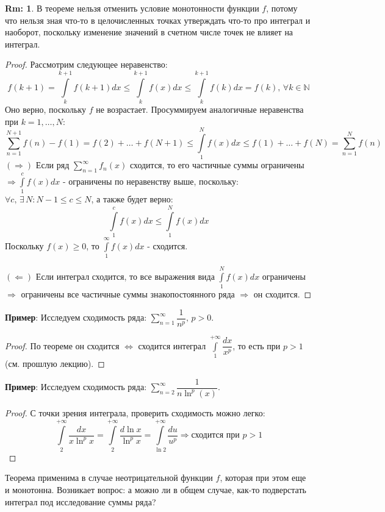 \documentclass[12pt]{article}
\newcommand{\MN}{\mathbb{N}}
\theoremstyle{definition}
\newtheorem{rem}{Rm:}
\newcommand{\ddsum}[2]{\displaystyle\sum\limits_{#1}^{#2}}
\newcommand{\ddint}[2]{\displaystyle\int\limits_{#1}^{#2}}
\newcommand{\ssum}[1]{\displaystyle \sum\limits_{n=1}^{\infty}{#1}_n}
\begin{document}
\begin{rem}
	В теореме нельзя отменить условие монотонности функции $f$, потому что нельзя зная что-то в целочисленных точках утверждать что-то про интеграл и наоборот, поскольку изменение значений в счетном числе точек не влияет на интеграл.
\end{rem}
\begin{proof}
	Рассмотрим следующее неравенство:
	$$
		f(k + 1) = \ddint{k}{k+1}f(k+1)dx \leq \ddint{k}{k+1}f(x)dx \leq  \ddint{k}{k+1}f(k)dx = f(k), \, \forall k \in \MN
	$$
	Оно верно, поскольку $f$ не возрастает. Просуммируем аналогичные неравенства при $k = 1, \dotsc, N$:
	$$
		\sum\limits_{n = 1}^{N+1}f(n) - f(1) = f(2) + \dotsc + f(N+1) \leq \ddint{1}{N}f(x)dx \leq f(1) + \dotsc + f(N) = \sum\limits_{n = 1}^{N}f(n)
	$$
	$(\Rightarrow)$ Если ряд $\ssum f(x)$ сходится, то его частичные суммы ограничены $\Rightarrow \ddint{1}{c}f(x)dx$ - ограничены по неравенству выше, поскольку: $\forall c, \, \exists  \, N \colon N-1 \leq c \leq N$, а также будет верно: 
	$$
		\ddint{1}{c}f(x)dx \leq \ddint{1}{N}f(x)dx
	$$
	Поскольку $f(x) \geq 0$, то $\ddint{1}{\infty}f(x)dx$ - сходится. 
	
	$(\Leftarrow)$ Если интеграл сходится, то все выражения вида $\ddint{1}{N}f(x)dx$ ограничены $\Rightarrow$ ограничены все частичные суммы знакопостоянного ряда $\Rightarrow$ он сходится.
\end{proof}

\textbf{Пример}: Исследуем сходимость ряда: $\ddsum{n = 1}{\infty}\dfrac{1}{n^p}, \, p > 0$. 
\begin{proof}
	По теореме он сходится $\Leftrightarrow$ сходится интеграл $\ddint{1}{+\infty}\dfrac{dx}{x^p}$, то есть при $p > 1$ (см. прошлую лекцию).
\end{proof}

\textbf{Пример}: Исследуем сходимость ряда: $\ddsum{n = 2}{\infty}\dfrac{1}{n \ln^p(x)}$. 
\begin{proof}
	С точки зрения интеграла, проверить сходимость можно легко:
	$$
	\ddint{2}{+\infty}\dfrac{dx}{x \ln^p{x}}= \ddint{2}{+\infty}\dfrac{d \ln{x}}{\ln^p{x}} = \ddint{\ln{2}}{+\infty}\dfrac{d u}{u^p} \Rightarrow \text{сходится при }p > 1 
	$$
\end{proof}

Теорема применима в случае неотрицательной функции $f$, которая при этом еще и монотонна. Возникает вопрос: а можно ли в общем случае, как-то подверстать интеграл под исследование суммы ряда?
\end{document}
